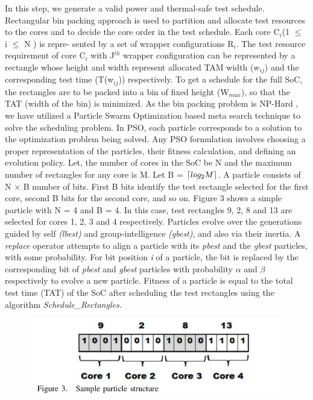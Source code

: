 \documentclass[conference]{IEEEtran}
\DeclarePairedDelimiter{\ceil}{\lceil}{\rceil}
\begin{document}
	\par
	In this step, we generate a valid power and thermal-safe test
schedule. Rectangular bin packing approach is used to partition
and allocate test resources to the cores and to decide the core
order in the test schedule. Each core C$_{i}$(1 $\leq$ i $\leq$ N ) is repre-
sented by a set of wrapper configurations R$_{i}$. The test resource
requirement of core C$_{i}$ with J$^{th}$ wrapper configuration can be
represented by a rectangle whose height and width represent
allocated TAM width (w$_{ij}$) and the corresponding test time
(T(w$_{ij}$)) respectively. To get a schedule for the full SoC, the
rectangles are to be packed into a bin of fixed height (W$_{max}$),
so that the TAT (width of the bin) is minimized. As the bin
packing problem is NP-Hard \cite{iyengar2002using}, we have utilized a Particle
Swarm Optimization based meta search technique to solve the
scheduling problem. In PSO, each particle corresponds to a
solution to the optimization problem being solved. Any PSO
formulation involves choosing a proper representation of the
particles, their fitness calculation, and defining an evolution
policy. Let, the number of cores in the SoC be N and
the maximum number of rectangles for any core is M. Let
B = $\ceil*{log_{2}M}$. A particle consists of N $\times$ B number of bits.
First B bits identify the test rectangle selected for the first
core, second B bits for the second core, and so on. Figure 3
shows a simple particle with N = 4 and B = 4. In this case,
test rectangles 9, 2, 8 and 13 are selected for cores 1, 2, 3 and
4 respectively. Particles evolve over the generations guided by
self \textit{(lbest)} and group-intelligence \textit{(gbest)}, and also via their
inertia. A \textit{replace} operator attempts to align a particle with its
\textit{pbest} and the \textit{gbest} particles, with some probability. For bit
position \textit{i} of a particle, the bit is replaced by the corresponding
bit of \textit{pbest} and \textit{gbest} particles with probability $\alpha$ and $\beta$
respectively to evolve a new particle. Fitness of a particle is
equal to the total test time (TAT) of the SoC after scheduling
the test rectangles using the algorithm \textit{Schedule\_Rectangles}.

\hypertarget{model}{\begin{figure}[ht]
    \center
   \includegraphics[width=\columnwidth]{4.png}
\end{figure}}
\end{document}
